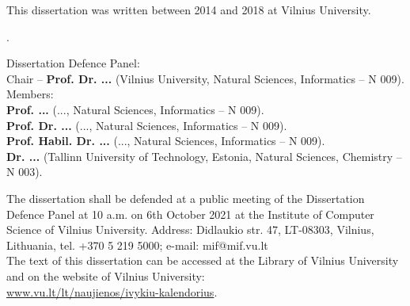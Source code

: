 \begin{singlespace}
\noindent\nohyphens{This dissertation was written between 2014 and 2018 at Vilnius University.}\\
\vspace{1cm}

.

\vspace{2cm}
\noindent
Dissertation Defence Panel: \\
{Chair  --} {{\bf Prof. Dr. ...} (Vilnius University, Natural Sciences, Informatics -- N 009)}.\\
Members:\\ %
{\bf Prof. ... }
(..., Natural Sciences, Informatics -- N 009).\\
{\bf Prof. Dr. ...}
(..., Natural Sciences, Informatics -- N 009).\\
{\bf Prof. Habil. Dr. ...} 
(..., Natural Sciences, Informatics -- N 009).\\
{\bf Dr. ...}
(Tallinn University of Technology, Estonia, Natural Sciences, Chemistry -- N 003).\\


\vspace{2cm}

\noindent
The dissertation shall be defended at a public meeting of the Dissertation
Defence Panel at 10 a.m. on 6th October 2021 at the Institute of Computer Science of Vilnius University. Address: Didlaukio str. 47, LT-08303, Vilnius, Lithuania, 
tel. +370 5 219 5000; e-mail: mif@mif.vu.lt \\

\vspace{1cm}
\noindent
The text of this dissertation can be accessed at the Library of Vilnius
University and on the website of Vilnius
University:\\ \href{ www.vu.lt/lt/naujienos/ivykiu-kalendorius}{ www.vu.lt/lt/naujienos/ivykiu-kalendorius}.



\end{singlespace}

